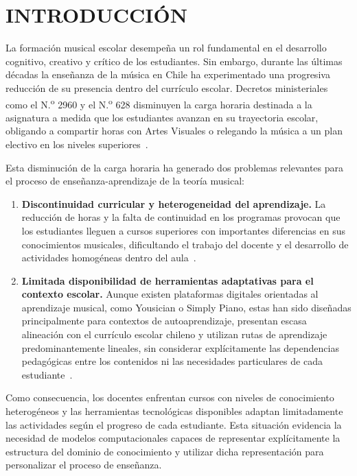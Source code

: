 \section{INTRODUCCIÓN}

La formación musical escolar desempeña un rol fundamental en el desarrollo cognitivo, creativo y crítico de los estudiantes. Sin embargo, durante las últimas décadas la enseñanza de la música en Chile ha experimentado una progresiva reducción de su presencia dentro del currículo escolar. Decretos ministeriales como el N.\textsuperscript{o} 2960 y el N.\textsuperscript{o} 628 disminuyen la carga horaria destinada a la asignatura a medida que los estudiantes avanzan en su trayectoria escolar, obligando a compartir horas con Artes Visuales o relegando la música a un plan electivo en los niveles superiores~\cite{mineduc_decreto2960_2012, mineduc_decreto628_2016}.

Esta disminución de la carga horaria ha generado dos problemas relevantes para el proceso de enseñanza-aprendizaje de la teoría musical:

\begin{enumerate}
\item \textbf{Discontinuidad curricular y heterogeneidad del aprendizaje.} La reducción de horas y la falta de continuidad en los programas provocan que los estudiantes lleguen a cursos superiores con importantes diferencias en sus conocimientos musicales, dificultando el trabajo del docente y el desarrollo de actividades homogéneas dentro del aula~\cite{chandia_educacion_2025}.

\item \textbf{Limitada disponibilidad de herramientas adaptativas para el contexto escolar.} Aunque existen plataformas digitales orientadas al aprendizaje musical, como Yousician o Simply Piano, estas han sido diseñadas principalmente para contextos de autoaprendizaje, presentan escasa alineación con el currículo escolar chileno y utilizan rutas de aprendizaje predominantemente lineales, sin considerar explícitamente las dependencias pedagógicas entre los contenidos ni las necesidades particulares de cada estudiante~\cite{garcia2025, alrowais2025, li2025}.
\end{enumerate}

Como consecuencia, los docentes enfrentan cursos con niveles de conocimiento heterogéneos y las herramientas tecnológicas disponibles adaptan limitadamente las actividades según el progreso de cada estudiante. Esta situación evidencia la necesidad de modelos computacionales capaces de representar explícitamente la estructura del dominio de conocimiento y utilizar dicha representación para personalizar el proceso de enseñanza.

